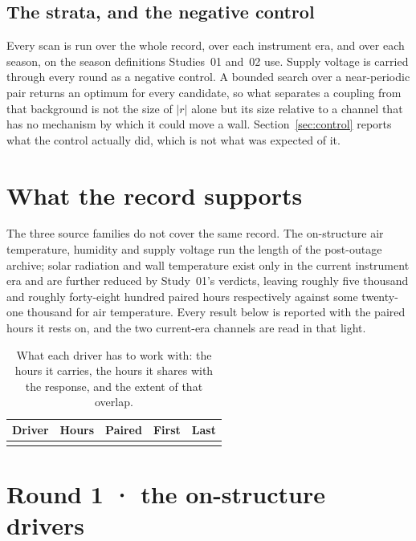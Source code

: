 \documentclass[11pt,a4paper]{article}
\begin{document}
\subsection{The strata, and the negative control}

Every scan is run over the whole record, over each instrument era, and over each
season, on the season definitions Studies~01 and~02 use. Supply voltage is
carried through every round as a negative control. A bounded search over a
near-periodic pair returns an optimum for every candidate, so what separates a
coupling from that background is not the size of $|r|$ alone but its size
relative to a channel that has no mechanism by which it could move a wall.
Section~\ref{sec:control} reports what the control actually did, which is not
what was expected of it.

\section{What the record supports}
\label{sec:coverage}

The three source families do not cover the same record. The on-structure air
temperature, humidity and supply voltage run the length of the post-outage archive; solar
radiation and wall temperature exist only in the current instrument era and are
further reduced by Study~01's verdicts, leaving roughly five thousand and
roughly forty-eight hundred paired hours respectively against some
twenty-one thousand for air temperature. Every result below is reported with
the paired hours it rests on, and the two current-era channels are read in that
light.

\begin{table}[H]
\centering
\small
\begin{tabular}{lrrll}
\toprule
\textbf{Driver} & \textbf{Hours} & \textbf{Paired} & \textbf{First} & \textbf{Last} \\
\midrule
\\
\bottomrule
\end{tabular}
\caption{What each driver has to work with: the hours it carries, the hours it
shares with the response, and the extent of that overlap.}
\label{tab:coverage}
\end{table}

\section{Round 1 · the on-structure drivers}
\label{sec:round1}
\end{document}
